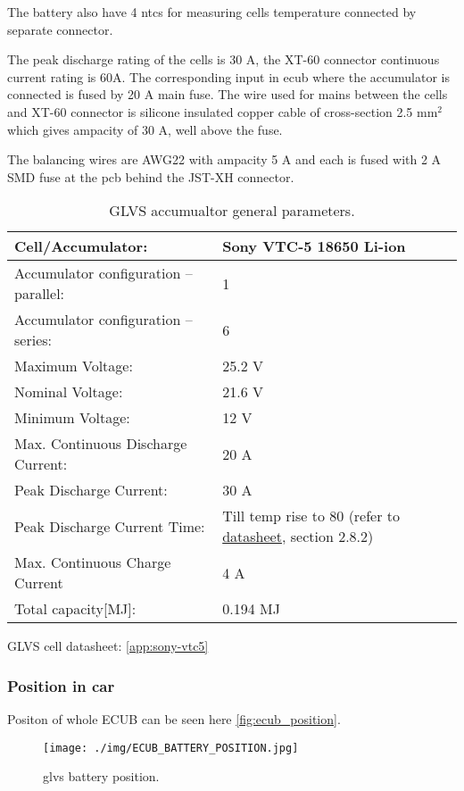The battery also have 4 \glspl{ntc} for measuring cells temperature connected by separate connector.

The peak discharge rating of the cells is 30 A, the XT-60 connector continuous current rating is 60A. The corresponding input in \gls{ecub} where the accumulator is connected is fused by 20 A main fuse. The wire used for mains between the cells and XT-60 connector is silicone insulated copper cable of cross-section 2.5 mm$^2$ which gives ampacity of 30 A, well above the fuse.

The balancing wires are AWG22 with ampacity 5 A and each is fused with 2 A SMD fuse at the \gls{pcb} behind the JST-XH connector.

\begin{table}[H]
	\centering
	\caption{GLVS accumualtor general parameters.}
	\begin{tabu}{|X|X|}\hline
		Cell/Accumulator: & Sony VTC-5 18650 Li-ion\\\hline
		Accumulator configuration – parallel: & 1 \\\hline
		Accumulator configuration – series: & 6 \\\hline
		Maximum Voltage: & 25.2 V \\\hline
		Nominal Voltage: & 21.6 V \\\hline
		Minimum Voltage: & 12 V \\\hline
		Max. Continuous Discharge Current: & 20 A \\\hline
		Peak Discharge Current: & 30 A \\\hline
		Peak Discharge Current Time: & Till temp rise to 80 \degC (refer to \hyperref[app:sony-vtc5]{datasheet}, section 2.8.2) \\\hline
		Max. Continuous Charge Current & 4 A\\\hline
		Total capacity[MJ]: & 0.194 MJ \\\hline
	\end{tabu}%
	\label{tab:LVbatt-general}%
\end{table}%

GLVS cell datasheet: \ref{app:sony-vtc5}

\subsubsection{Position in car}
Positon of whole ECUB can be seen here \ref{fig:ecub_position}.
\begin{figure}[H]
	\centering
	\texttt{[image: ./img/ECUB\_BATTERY\_POSITION.jpg]}
	\caption{\gls{glvs} battery position.}
	\label{fig:GLVS_battery_position}
\end{figure}

